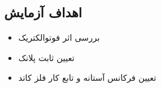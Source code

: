 



\subsection*{\Large اهداف آزمایش}
\begin{itemize}
    \item بررسی اثر فوتوالکتریک
    \item تعیین ثابت پلانک
    \item تعیین فرکانس آستانه و تابع کار فلز کاتد
\end{itemize}